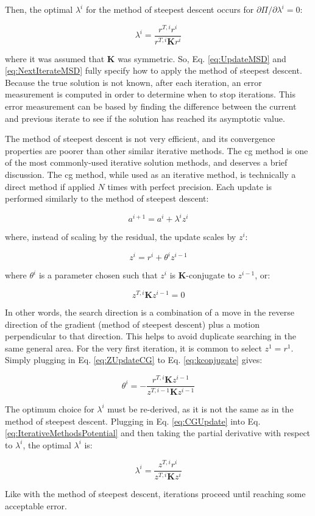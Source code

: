 \documentclass[10pt]{article}
\newcommand{\beq}{\begin{equation}}
\newcommand{\eeq}{\end{equation}}
\begin{document}
Then, the optimal \(\lambda^i\) for the method of steepest descent occurs for \(\partial\Pi/\partial\lambda^i=0\):

\beq
\label{eq:UpdateMSD}
\lambda^i=\frac{r^{T,i}r^i}{r^{T,i}\textbf{K}r^i}
\eeq

where it was assumed that \(\textbf{K}\) was symmetric. So, Eq. \eqref{eq:UpdateMSD} and \eqref{eq:NextIterateMSD} fully specify how to apply the method of steepest descent. Because the true solution is not known, after each iteration, an error measurement is computed in order to determine when to stop iterations. This error measurement can be based by finding the difference between the current and previous iterate to see if the solution has reached its asymptotic value.\newline

The method of steepest descent is not very efficient, and its convergence properties are poorer than other similar iterative methods. The \gls{cg} method is one of the most commonly-used iterative solution methods, and deserves a brief discussion. The \gls{cg} method, while used as an iterative method, is technically a direct method if applied \(N\) times with perfect precision. Each update is performed similarly to the method of steepest descent:

\beq
\label{eq:CGUpdate}
a^{i+1}=a^i+\lambda^iz^i
\eeq

where, instead of scaling by the residual, the update scales by \(z^i\):

\beq
\label{eq:ZUpdateCG}
z^i=r^i+\theta^iz^{i-1}
\eeq

where \(\theta^i\) is a parameter chosen such that \(z^i\) is \(\textbf{K}\)-conjugate to \(z^{i-1}\), or:

\beq
\label{eq:kconjugate}
z^{T,i}\textbf{K}z^{i-1}=0
\eeq

In other words, the search direction is a combination of a move in the reverse direction of the gradient (method of steepest descent) plus a motion perpendicular to that direction. This helps to avoid duplicate searching in the same general area. For the very first iteration, it is common to select \(z^1=r^1\). Simply plugging in Eq. \eqref{eq:ZUpdateCG} to Eq. \eqref{eq:kconjugate} gives:

\beq
\theta^i=-\frac{r^{T,i}\textbf{K}z^{i-1}}{z^{T,i-1}\textbf{K}z^{i-1}}
\eeq

The optimum choice for \(\lambda^i\) must be re-derived, as it is not the same as in the method of steepest descent. Plugging in Eq. \eqref{eq:CGUpdate} into Eq. \eqref{eq:IterativeMethodsPotential} and then taking the partial derivative with respect to \(\lambda^i\), the optimal \(\lambda^i\) is:

\beq
\label{eq:UpdateCG}
\lambda^i=\frac{z^{T,i}r^i}{z^{T,i}\textbf{K}z^i}
\eeq

Like with the method of steepest descent, iterations proceed until reaching some acceptable error. 
\end{document}
